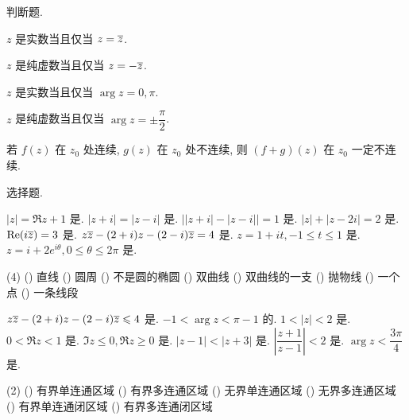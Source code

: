 \begin{homework}
  \item 判断题.
    \begin{exlist}
      \item $z$ 是实数当且仅当 $z=\overline z$. \fillbrace{}
      \item $z$ 是纯虚数当且仅当 $z=-\overline z$. \fillbrace{}
      \item $z$ 是实数当且仅当 $\arg z=0,\pi$. \fillbrace{}
      \item $z$ 是纯虚数当且仅当 $\arg z=\pm\dfrac\pi2$. \fillbrace{}
      \item 若 $f(z)$ 在 $z_0$ 处连续, $g(z)$ 在 $z_0$ 处不连续, 则 $(f+g)(z)$ 在 $z_0$ 一定不连续. \fillbrace{}
    \end{exlist}
  \item 选择题.
    \begin{exlist}
      \item \begin{tasks}
        \task $|z|=\Re z+1$ 是\fillbrace{}.
        \task $|z+i|=|z-i|$ 是\fillbrace{}.
        \task $\bigl||z+i|-|z-i|\bigr|=1$ 是\fillbrace{}.
        \task $|z|+|z-2i|=2$ 是\fillbrace{}.
        \task $\operatorname{Re}(i\overline z)=3$ 是\fillbrace{}.
        \task $z\overline z-(2+i)z-(2-i)\overline z=4$ 是\fillbrace{}.
        \task $z=1+it,-1\le t\le 1$ 是\fillbrace{}.
        \task $z=i+2e^{i\theta},0\le \theta\le 2\pi$ 是\fillbrace{}.
      \end{tasks}
        \begin{taskschoice}(4)
          () 直线
          () 圆周
          () 不是圆的椭圆
          () 双曲线
          () 双曲线的一支
          () 抛物线
          () 一个点
          () 一条线段
        \end{taskschoice}
      \item \begin{tasks}
        \task $z\overline z-(2+i)z-(2-i)\overline z\leqslant 4$ 是\fillbrace{}.
        \task $-1<\arg z<\pi-1$ 的\fillbrace{}.
        \task $1<|z|<2$ 是\fillbrace{}.
        \task $0<\Re z<1$ 是\fillbrace{}.
        \task $\Im z\le0,\Re z\ge0$ 是\fillbrace{}.
        \task $|z-1|<|z+3|$ 是\fillbrace{}.
        \task $\left|\dfrac{z+1}{z-1}\right|<2$ 是\fillbrace{}.
        \task $\arg z<\dfrac{3\pi}4$ 是\fillbrace{}.
      \end{tasks}
        \begin{taskschoice}(2)
          () 有界单连通区域
          () 有界多连通区域
          () 无界单连通区域
          () 无界多连通区域
          () 有界单连通闭区域
          () 有界多连通闭区域

\end{taskschoice}
\end{exlist}
\end{homework}
